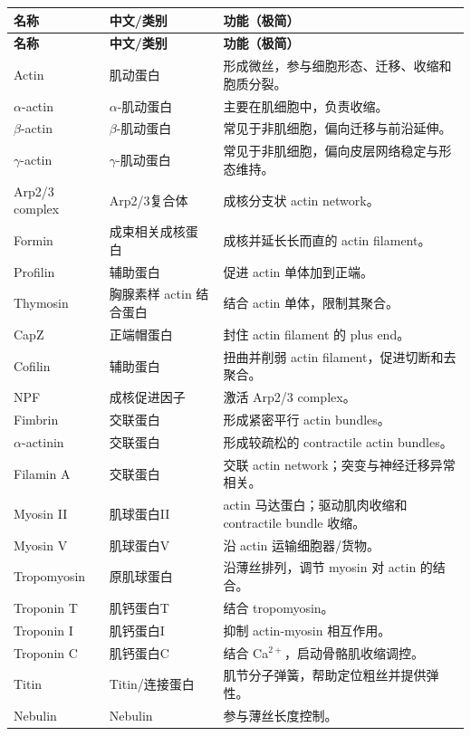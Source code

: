 \documentclass[11pt,fontset=none]{ctexart}
\begin{document}
\begin{longtable}{L{3.2cm} L{3.8cm} L{8.5cm}}
\toprule
\textbf{名称} & \textbf{中文/类别} & \textbf{功能（极简）} \\
\midrule
\endfirsthead
\toprule
\textbf{名称} & \textbf{中文/类别} & \textbf{功能（极简）} \\
\midrule
\endhead
\bottomrule
\endfoot
Actin & 肌动蛋白 & 形成微丝，参与细胞形态、迁移、收缩和胞质分裂。 \\
$\alpha$-actin & $\alpha$-肌动蛋白 & 主要在肌细胞中，负责收缩。 \\
$\beta$-actin & $\beta$-肌动蛋白 & 常见于非肌细胞，偏向迁移与前沿延伸。 \\
$\gamma$-actin & $\gamma$-肌动蛋白 & 常见于非肌细胞，偏向皮层网络稳定与形态维持。 \\
Arp2/3 complex & Arp2/3复合体 & 成核分支状 actin network。 \\
Formin & 成束相关成核蛋白 & 成核并延长长而直的 actin filament。 \\
Profilin & 辅助蛋白 & 促进 actin 单体加到正端。 \\
Thymosin & 胸腺素样 actin 结合蛋白 & 结合 actin 单体，限制其聚合。 \\
CapZ & 正端帽蛋白 & 封住 actin filament 的 plus end。 \\
Cofilin & 辅助蛋白 & 扭曲并削弱 actin filament，促进切断和去聚合。 \\
NPF & 成核促进因子 & 激活 Arp2/3 complex。 \\
Fimbrin & 交联蛋白 & 形成紧密平行 actin bundles。 \\
$\alpha$-actinin & 交联蛋白 & 形成较疏松的 contractile actin bundles。 \\
Filamin A & 交联蛋白 & 交联 actin network；突变与神经迁移异常相关。 \\
Myosin II & 肌球蛋白II & actin 马达蛋白；驱动肌肉收缩和 contractile bundle 收缩。 \\
Myosin V & 肌球蛋白V & 沿 actin 运输细胞器/货物。 \\
Tropomyosin & 原肌球蛋白 & 沿薄丝排列，调节 myosin 对 actin 的结合。 \\
Troponin T & 肌钙蛋白T & 结合 tropomyosin。 \\
Troponin I & 肌钙蛋白I & 抑制 actin-myosin 相互作用。 \\
Troponin C & 肌钙蛋白C & 结合 Ca$^{2+}$，启动骨骼肌收缩调控。 \\
Titin & Titin/连接蛋白 & 肌节分子弹簧，帮助定位粗丝并提供弹性。 \\
Nebulin & Nebulin & 参与薄丝长度控制。 \\

\end{longtable}
\end{document}
